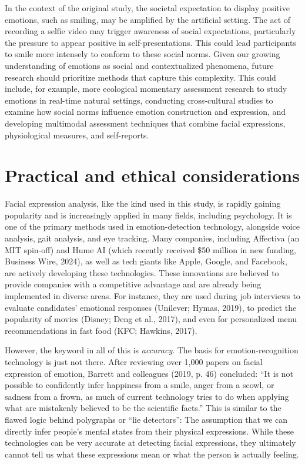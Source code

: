\documentclass[authordate, reflection,issue]{jote-new-article}
\begin{document}
	In the context of the original study, the societal expectation to display positive emotions, such as smiling, may be amplified by the artificial setting. The act of recording a selfie video may trigger awareness of social expectations, particularly the pressure to appear positive in self-presentations. This could lead participants to smile more intensely to conform to these social norms. Given our growing understanding of emotions as social and contextualized phenomena, future research should prioritize methods that capture this complexity. This could include, for example, more ecological momentary assessment research to study emotions in real-time natural settings, conducting cross-cultural studies to examine how social norms influence emotion construction and expression, and developing multimodal assessment techniques that combine facial expressions, physiological measures, and self-reports.







	\section{Practical and ethical considerations}



	Facial expression analysis, like the kind used in this study, is rapidly gaining popularity and is increasingly applied in many fields, including psychology. It is one of the primary methods used in emotion-detection technology, alongside voice analysis, gait analysis, and eye tracking. Many companies, including Affectiva (an MIT spin-off) and Hume AI (which recently received \$50 million in new funding, Business Wire, 2024), as well as tech giants like Apple, Google, and Facebook, are actively developing these technologies. These innovations are believed to provide companies with a competitive advantage and are already being implemented in diverse areas. For instance, they are used during job interviews to evaluate candidates' emotional responses (Unilever; Hymas, 2019), to predict the popularity of movies (Disney; Deng et al., 2017), and even for personalized menu recommendations in fast food (KFC; Hawkins, 2017).



	However, the keyword in all of this is \emph{accuracy}. The basis for emotion-recognition technology is just not there. After reviewing over 1,000 papers on facial expression of emotion, Barrett and colleagues (2019, p. 46) concluded: “It is not possible to confidently infer happiness from a smile, anger from a scowl, or sadness from a frown, as much of current technology tries to do when applying what are mistakenly believed to be the scientific facts.” This is similar to the flawed logic behind polygraphs or “lie detectors”: The assumption that we can directly infer people's mental states from their physical expressions. While these technologies can be very accurate at detecting facial expressions, they ultimately cannot tell us what these expressions mean or what the person is actually feeling.
\end{document}
